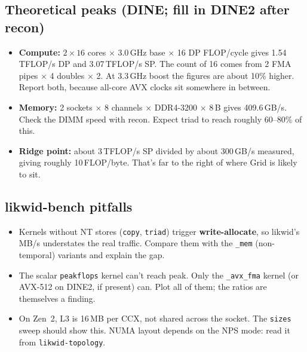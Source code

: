 \documentclass[10pt,a4paper]{article}
\begin{document}
\subsection*{Theoretical peaks (DINE; fill in DINE2 after recon)}
\begin{itemize}
  \item \textbf{Compute:} $2\times16$ cores $\times$ 3.0\,GHz base $\times$ 16 DP FLOP/cycle gives 1.54\,TFLOP/s DP and 3.07\,TFLOP/s SP. The count of 16 comes from 2 FMA pipes $\times$ 4 doubles $\times$ 2. At 3.3\,GHz boost the figures are about 10\% higher. Report both, because all-core AVX clocks sit somewhere in between.
  \item \textbf{Memory:} 2 sockets $\times$ 8 channels $\times$ DDR4-3200 $\times$ 8\,B gives 409.6\,GB/s. Check the DIMM speed with recon. Expect triad to reach roughly 60--80\% of this.
  \item \textbf{Ridge point:} about 3\,TFLOP/s SP divided by about 300\,GB/s measured, giving roughly 10\,FLOP/byte. That's far to the right of where Grid is likely to sit.
\end{itemize}

\subsection*{likwid-bench pitfalls}
\begin{itemize}
  \item Kernels without NT stores (\texttt{copy}, \texttt{triad}) trigger \textbf{write-allocate}, so likwid's MB/s understates the real traffic. Compare them with the \texttt{\_mem} (non-temporal) variants and explain the gap.
  \item The scalar \texttt{peakflops} kernel can't reach peak. Only the \texttt{\_avx\_fma} kernel (or AVX-512 on DINE2, if present) can. Plot all of them; the ratios are themselves a finding.
  \item On Zen~2, L3 is 16\,MB per CCX, not shared across the socket. The \texttt{sizes} sweep should show this. NUMA layout depends on the NPS mode: read it from \texttt{likwid-topology}.
\end{itemize}
\end{document}
